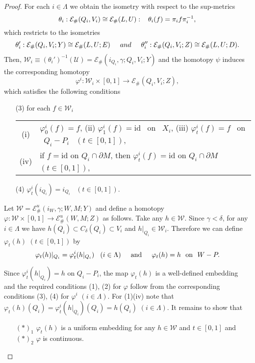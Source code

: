 \documentclass[11pt, fleqn]{amsart}
\theoremstyle{definition}
\newcommand{\cal}{\mathcal}
\renewcommand{\phi}{\varphi}
\newcommand{\lra}{\longrightarrow}
\newcommand{\e}{\varepsilon}
\newcommand{\id}{\mathrm{id}}
\newcommand{\E}{\mathcal E}
\begin{document}
\begin{proof}
For each $i \in \Lambda$ 
we obtain the isometry with respect to the sup-metrics 
$$\theta_i : \E_\#(Q_i, V_i) \cong \E_\#(L, U) : \hspace{3mm} \theta_i(f) = \pi_i f \pi_i^{-1},$$
which restricts to the isometries 
$$\theta_i' : \E_\#(Q_i, V_i; Y) \cong \E_\#(L, U; E) \hspace{5mm} and \hspace{5mm} 
\theta_i'' : \E_\#(Q_i, V_i; Z) \cong \E_\#(L, U; D).$$ 
Then, ${\cal W}_i \equiv (\theta_i')^{-1}({\cal U}) = {\mathcal E}_\#(i_{Q_i}, \gamma; Q_i, V_i; Y)$ 
and the homotopy $\psi$ induces the corresponding homotopy 
$$\phi^i : {\cal W}_i \times [0,1] \to \E_\#(Q_i, V_i; Z),$$
which satisfies the following conditions
\begin{itemize}
\item[{\rm (3)}] for each $f \in {\cal W}_i$ \\
\begin{tabular}[t]{c@{\ \,}l}
{\rm (i)} & $\varphi^i_0(f) = f$, \hspace{3mm} {\rm (ii)} 
$\varphi^i_1(f) = \id$ \ on \ $X_i$, \hspace{3mm} {\rm (iii)} 
$\varphi^i_t(f) = f$ \ on \ $Q_i - P_i$ \ $(t \in [0,1])$, \\[2mm] 
{\rm (iv)} & if $f = \id$ on $Q_i \cap \partial M$, then $\varphi^i_t(f) = \id$ on $Q_i \cap \partial M$ $(t \in [0,1])$, 
\end{tabular}
\vskip 1.5mm 
\item[{\rm (4)}] $\varphi^i_t(i_{Q_i}) = i_{Q_i}$ \ $(t \in [0,1])$. 
\end{itemize}
 
Let ${\cal W} = \E^u_\#(i_W, \gamma; W, M; Y)$ and define a homotopy $\phi : {\cal W} \times [0,1] \lra \E^u_\#(W, M; Z)$ as follows. 
Take any $h \in {\cal W}$. Since $\gamma < \delta$,
for any $i \in \Lambda$ we have $h(Q_i) \subset C_{\delta}(Q_i) \subset V_i$ and 
$h|_{Q_i} \in {\cal W}_i$. 
Therefore we can define $\phi_t(h)$ $(t \in [0,1])$ by 
$$\phi_t(h)|_{Q_i} = \phi^i_t(h|_{Q_i}) \hspace{3mm} (i \in \Lambda) \hspace{5mm} 
\text{and} \hspace{5mm} \phi_t(h) = h \ \ \text{on} \ \ W - P.$$ 
 
Since $\phi^i_t(h|_{Q_i}) = h$ on $Q_i - P_i$, the map $\phi_t(h)$ is a well-defined embedding 
and the required conditions (1), (2) for $\phi$ follow from the corresponding conditions (3), (4) for $\phi^i$ $(i \in \Lambda)$. 
For (1)(iv) note that $\phi_t(h)(Q_i) = \phi^i_t(h|_{Q_i})(Q_i) = h(Q_i)$ $(i \in \Lambda)$. 
It remains to show that 
\begin{itemize}
\item[] $(\ast)_1$ $\phi_t(h)$ is a uniform embedding for any $h \in {\cal W}$ and $t \in [0,1]$ 
\hspace{1mm} and 
\hspace{1mm} $(\ast)_2$ $\phi$ is continuous. 
\end{itemize}


\end{proof}
\end{document}

